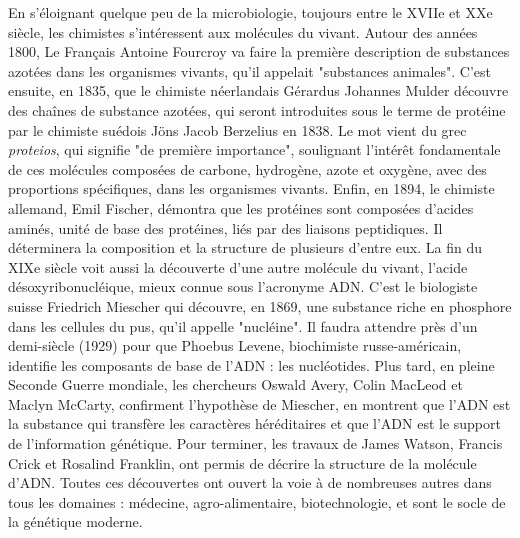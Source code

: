 En s'éloignant quelque peu de la microbiologie, toujours entre le XVIIe et XXe siècle, les chimistes s'intéressent aux molécules du vivant. Autour des années 1800, Le Français Antoine Fourcroy va faire la première description de substances azotées dans les organismes vivants, qu'il appelait "substances animales". C'est ensuite, en 1835, que le chimiste néerlandais Gérardus Johannes Mulder découvre des chaînes de substance azotées, qui seront introduites sous le terme de protéine par le chimiste suédois Jöns Jacob Berzelius en 1838. Le mot vient du grec \textit{proteios}, qui signifie "de première importance", soulignant l'intérêt fondamentale de ces molécules composées de carbone, hydrogène, azote et oxygène, avec des proportions spécifiques, dans les organismes vivants. Enfin, en 1894, le chimiste allemand, Emil Fischer, démontra que les protéines sont composées d'acides aminés, unité de base des protéines, liés par des liaisons peptidiques. Il déterminera la composition et la structure de plusieurs d'entre eux. La fin du XIXe siècle voit aussi la découverte d'une autre molécule du vivant, l'acide désoxyribonucléique, mieux connue sous l'acronyme ADN. C'est le biologiste suisse Friedrich Miescher qui découvre, en 1869, une substance riche en phosphore dans les cellules du pus, qu'il appelle "nucléine". Il faudra attendre près d'un demi-siècle (1929) pour que Phoebus Levene, biochimiste russe-américain, identifie les composants de base de l'ADN : les nucléotides. Plus tard, en pleine Seconde Guerre mondiale, les chercheurs Oswald Avery, Colin MacLeod et Maclyn McCarty, confirment l'hypothèse de Miescher, en montrent que l’ADN est la substance qui transfère les caractères héréditaires et que l'ADN est le support de l’information génétique. Pour terminer, les travaux de James Watson, Francis Crick  et Rosalind Franklin, ont permis de décrire la structure de la molécule d'ADN. Toutes ces découvertes ont ouvert la voie à de nombreuses autres dans tous les domaines : médecine, agro-alimentaire, biotechnologie, et sont le socle de la génétique moderne.

